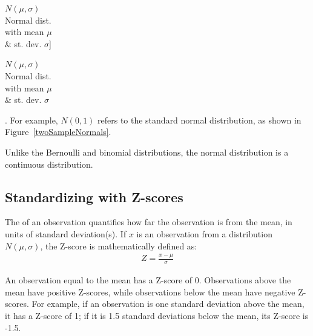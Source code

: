 $N(\mu, \sigma)$\vspace{1mm}\\\footnotesize Normal dist.\\with mean $\mu$\\\& st. dev. $\sigma$]{\raggedright\vspace{-5mm}

$N(\mu, \sigma)$\vspace{1mm}\\\footnotesize Normal dist.\\with mean $\mu$\\\& st. dev. $\sigma$}. For example, $N(0, 1)$ refers to the standard normal distribution, as shown in Figure~\ref{twoSampleNormals}. 

Unlike the Bernoulli and binomial distributions, the normal distribution is a continuous distribution. 

\subsection{Standardizing with Z-scores}

The  of an observation quantifies how far the observation is from the mean, in units of standard deviation(s). If $x$ is an observation from a distribution $N(\mu, \sigma)$, the Z-score is mathematically defined as:
\begin{align*}
	Z = \frac{x-\mu}{\sigma}
\end{align*}

An observation equal to the mean has a Z-score of 0. Observations above the mean have positive Z-scores, while observations below the mean have negative Z-scores. For example, if an observation is one standard deviation above the mean, it has a Z-score of 1; if it is 1.5 standard deviations below the mean, its Z-score is -1.5. 

